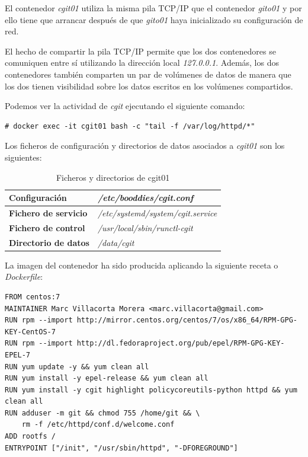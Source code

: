 \documentclass[a4paper,12pt,spanish,final]{epsc_tfc_pfc}
\begin{document}
El contenedor \emph{cgit01} utiliza la misma pila TCP/IP que el contenedor \emph{gito01} y por ello tiene que arrancar después de que \emph{gito01} haya inicializado su configuración de red.

El hecho de compartir la pila TCP/IP permite que los dos contenedores se comuniquen entre sí utilizando la dirección local \emph{127.0.0.1}. Además, los dos contenedores también comparten un par de volúmenes de datos de manera que los dos tienen visibilidad sobre los datos escritos en los volúmenes compartidos.

Podemos ver la actividad de \emph{cgit} ejecutando el siguiente comando:\\

\begin{lstlisting}[style=dnsmasq]
# docker exec -it cgit01 bash -c "tail -f /var/log/httpd/*"
\end{lstlisting}

Los ficheros de configuración y directorios de datos asociados a \emph{cgit01} son los siguientes:

\begin{table}[h]

  \centering

  \begin{tabular}{ll}
    \toprule
    \textbf{Configuración}        & \textit{/etc/booddies/cgit.conf}          \\
    \midrule
    \rowcolor[HTML]{EFEFEF}
    \textbf{Fichero de servicio}  & \textit{/etc/systemd/system/cgit.service} \\
    \midrule
    \textbf{Fichero de control}   & \textit{/usr/local/sbin/runctl-cgit}      \\
    \midrule
    \rowcolor[HTML]{EFEFEF}
    \textbf{Directorio de datos}  & \textit{/data/cgit}                       \\
    \bottomrule
  \end{tabular}

  \caption{Ficheros y directorios de cgit01}

\end{table}

La imagen del contenedor ha sido producida aplicando la siguiente receta o \emph{Dockerfile}:\\

\begin{lstlisting}[style=dnsmasq]
FROM centos:7
MAINTAINER Marc Villacorta Morera <marc.villacorta@gmail.com>
RUN rpm --import http://mirror.centos.org/centos/7/os/x86_64/RPM-GPG-KEY-CentOS-7
RUN rpm --import http://dl.fedoraproject.org/pub/epel/RPM-GPG-KEY-EPEL-7
RUN yum update -y && yum clean all
RUN yum install -y epel-release && yum clean all
RUN yum install -y cgit highlight policycoreutils-python httpd && yum clean all
RUN adduser -m git && chmod 755 /home/git && \
    rm -f /etc/httpd/conf.d/welcome.conf
ADD rootfs /
ENTRYPOINT ["/init", "/usr/sbin/httpd", "-DFOREGROUND"]
\end{lstlisting}
\end{document}
